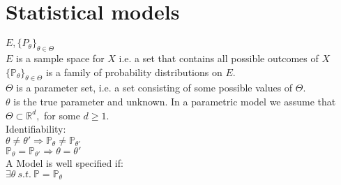 \section{Statistical models}

$E, \{ P_\theta \} _{\theta \in \Theta }$\\

$E$ is a sample space for $X$ i.e. a set that contains all possible outcomes of $X$\\

$\displaystyle \{ \mathbb {P_\theta }\} _{\theta \in \Theta }$ is a family of probability distributions on $E$.\\

$\Theta$ is a parameter set, i.e. a set consisting of some possible values of $\Theta$.\\

$\theta$ is the true parameter and unknown. In a parametric model we assume that $\Theta \subset \mathbb{R}^d,$ for some $d \geq 1$.\\

Identifiability:\\

$\theta \neq \theta' \Rightarrow \mathbb{P}_{\theta} \neq \mathbb{P}_{\theta'}$\\

$ \mathbb{P}_{\theta} = \mathbb{P}_{\theta'} \Rightarrow \theta = \theta'$\\

A Model is well specified if:\\

$\exists \theta \ s.t.\ \mathbb{P} =\mathbb{P}_{\theta }$